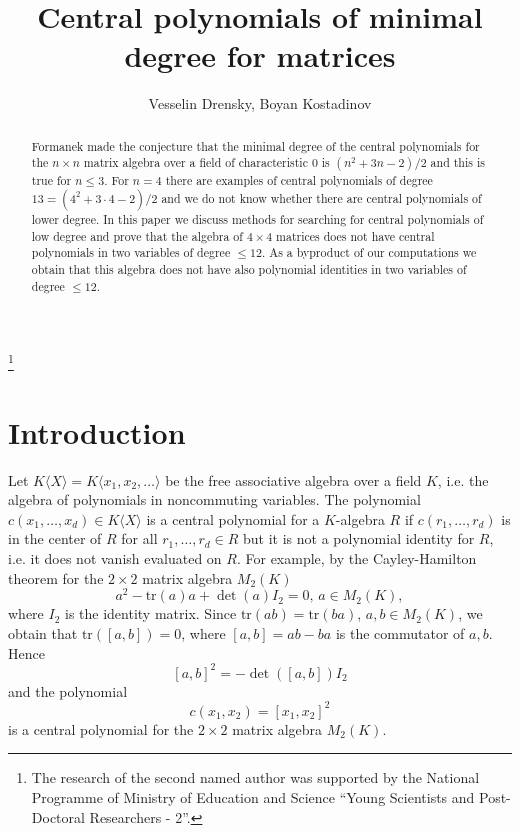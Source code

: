 \documentclass[12pt]{amsart}
\theoremstyle{definition}
\begin{document}
\title[Central polynomials of minimal degree for matrices]
{Central polynomials of minimal degree for matrices}

\author[Vesselin Drensky, Boyan Kostadinov]
{Vesselin Drensky, Boyan Kostadinov}
\address{Institute of Mathematics and Informatics
\newline Bulgarian Academy of Sciences, 1113 Sofia, Bulgaria}

\thanks{The research of the second named author was supported
by the National Programme of Ministry of Education and Science
``Young Scientists and Post-Doctoral Researchers - 2''.}



\maketitle

\begin{abstract}
Formanek made the conjecture that the minimal degree of the central polynomials for the $n\times n$ matrix algebra over a field of characteristic 0 is $(n^2+3n-2)/2$
and this is true for $n\leq 3$. For $n=4$ there are examples of central polynomials of degree $13=(4^2+3\cdot 4-2)/2$ and we do not know whether there are central polynomials of lower degree.
In this paper we discuss methods for searching for central polynomials of low degree and prove
that the algebra of $4\times 4$ matrices does not have central polynomials in two variables of degree $\leq 12$.
As a byproduct of our computations we obtain that this algebra does not have also polynomial identities in two variables of degree $\leq 12$.
\end{abstract}

\section{Introduction}

Let $K\langle X\rangle=K\langle x_1,x_2,\ldots\rangle$ be the free associative algebra over a field $K$, i.e. the algebra of polynomials in noncommuting variables.
The polynomial $c(x_1,\ldots,x_d)\in K\langle X\rangle$ is a central polynomial for a $K$-algebra $R$
if $c(r_1,\ldots,r_d)$ is in the center of $R$ for all $r_1,\ldots,r_d\in R$ but it is not a polynomial identity for $R$, i.e. it does not vanish evaluated on $R$.
For example, by the Cayley-Hamilton theorem for the $2\times 2$ matrix algebra $M_2(K)$
\[
a^2-\text{tr}(a)a+\det(a)I_2=0,\,a\in M_2(K),
\]
where $I_2$ is the identity matrix. Since $\text{tr}(ab)=\text{tr}(ba)$, $a,b\in M_2(K)$, we obtain that
$\text{tr}([a,b])=0$, where $[a,b]=ab-ba$ is the commutator of $a,b$. Hence
\[
[a,b]^2=-\det([a,b])I_2
\]
and the polynomial
\[
c(x_1,x_2)=[x_1,x_2]^2
\]
is a central polynomial for the $2\times 2$ matrix algebra $M_2(K)$.
\end{document}
